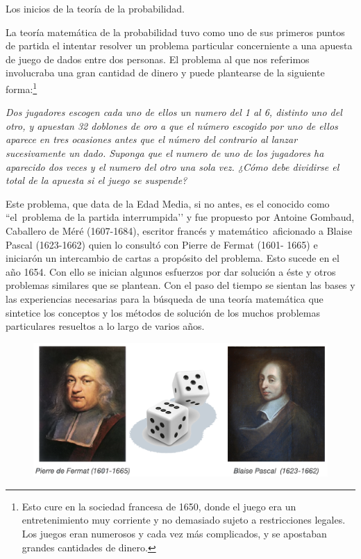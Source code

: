 \begin{myexampleblock}{Los inicios de la teoría de la probabilidad.}
\begin{small}La teoría matemática de la probabilidad tuvo como uno de sus primeros puntos de partida el intentar resolver un problema particular concerniente a una apuesta de juego de dados entre dos personas. El problema al que nos referimos involucraba una gran cantidad de dinero y puede plantearse de la siguiente forma:\footnote{Esto cure en la sociedad francesa de 1650, donde el juego era un entretenimiento muy corriente y no demasiado sujeto a restricciones legales. Los juegos eran numerosos y cada vez más complicados, y se apostaban grandes cantidades de dinero.} 

\vspace{2mm}\textit{\textsf{Dos jugadores escogen cada uno de ellos un numero del 1 al 6, distinto uno del otro, y apuestan 32 doblones de oro a que el número escogido por uno de ellos aparece en tres ocasiones antes que el número del contrario al lanzar sucesivamente un dado. Suponga que el numero de uno de los jugadores ha aparecido dos veces y el numero del otro una sola vez. ¿Cómo debe dividirse el total de la apuesta si el juego se suspende?}}

\vspace{2mm}Este problema, que data de la Edad Media, si no antes, es el conocido como ``el problema de la partida interrumpida’’ y fue propuesto por Antoine Gombaud, Caballero de Méré (1607-1684), escritor francés y matemático aficionado a Blaise Pascal (1623-1662) quien lo consultó con Pierre de Fermat (1601- 1665) e iniciarón un intercambio de cartas a propósito del problema. Esto sucede en el año 1654. Con ello se inician algunos esfuerzos por dar solución a éste y otros problemas similares que se plantean.  Con el paso del tiempo se sientan las bases y las experiencias necesarias para la búsqueda de una teoría matemática que sintetice los conceptos y los métodos de solución de los muchos problemas particulares resueltos a lo largo de varios años. 

	\begin{figure}[H]
			\centering
			\includegraphics[width=.8\textwidth]{imagenes/imagenes02/T02IM12.png}
	\end{figure}



\end{small}
\end{myexampleblock}
